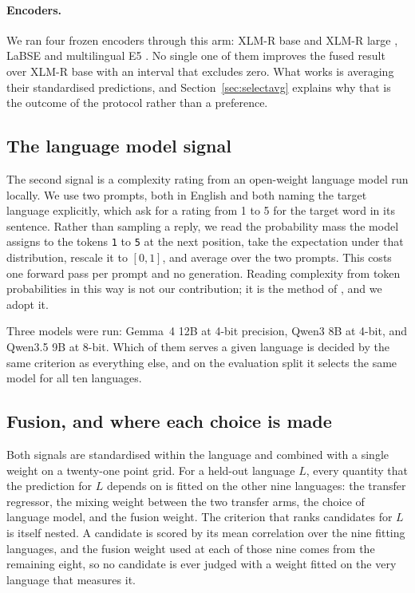 \paragraph{Encoders.} We ran four frozen encoders through this
arm: XLM-R base and XLM-R large \citep{conneau2020xlmr}, LaBSE
\citep{feng-etal-2022-language} and multilingual E5
\citep{wang2024multilinguale5}. No single one of them improves the
fused result over XLM-R base with an interval that excludes zero. What
works is averaging their standardised predictions, and
Section~\ref{sec:selectavg} explains why that is the outcome of the
protocol rather than a preference.

\subsection{The language model signal}
\label{sec:signalB}

The second signal is a complexity rating from an open-weight language
model run locally. We use two prompts, both in English and both naming
the target language explicitly, which ask for a rating from 1 to 5 for
the target word in its sentence. Rather than sampling a reply, we read
the probability mass the model assigns to the tokens \texttt{1} to
\texttt{5} at the next position, take the expectation under that
distribution, rescale it to $[0,1]$, and average over the two prompts.
This costs one forward pass per prompt and no generation. Reading
complexity from token probabilities in this way is not our contribution;
it is the method of \citet{nohejl-etal-2025-japanese}, and we adopt it.

Three models were run: Gemma~4 12B at 4-bit precision, Qwen3 8B at
4-bit, and Qwen3.5 9B at 8-bit. Which of them serves a given language is
decided by the same criterion as everything else, and on the evaluation
split it selects the same model for all ten languages.

\subsection{Fusion, and where each choice is made}
\label{sec:lolo}

Both signals are standardised within the language and combined with a
single weight on a twenty-one point grid. For a held-out language $L$,
every quantity that the prediction for $L$ depends on is fitted on the
other nine languages: the transfer regressor, the mixing weight between
the two transfer arms, the choice of language model, and the fusion
weight. The criterion that ranks candidates for $L$ is itself nested. A
candidate is scored by its mean correlation over the nine fitting
languages, and the fusion weight used at each of those nine comes from
the remaining eight, so no candidate is ever judged with a weight fitted
on the very language that measures it.

